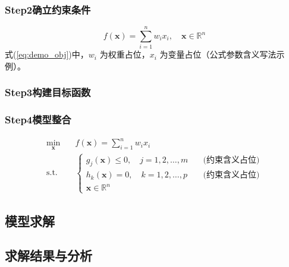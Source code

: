 \documentclass{JXUSTmodeling}
\begin{document}
\subsubsection*{Step2确立约束条件}

\begin{equation}
	f(\boldsymbol{x})=\sum_{i=1}^{n} w_i x_i,\quad \boldsymbol{x}\in\mathbb{R}^{n}
	\label{eq:demo_obj}
\end{equation}
式(\ref{eq:demo_obj})中，$w_i$ 为权重占位，$x_i$ 为变量占位（公式参数含义写法示例）。

\subsubsection*{Step3构建目标函数}

\subsubsection*{Step4模型整合}
\begin{equation*}
	\begin{aligned}
		\min_{\boldsymbol{x}} \quad & f(\boldsymbol{x})=\sum_{i=1}^{n} w_i x_i \\
		\text{s.t.} \quad
		& \begin{cases}
			g_j(\boldsymbol{x}) \le 0, \quad j=1,2,\dots,m \quad &\text{(约束含义占位)}\\
			h_k(\boldsymbol{x}) = 0, \quad k=1,2,\dots,p \quad &\text{(约束含义占位)}\\
			\boldsymbol{x}\in\mathbb{R}^{n}
		\end{cases}
	\end{aligned}
\end{equation*}

\subsection{模型求解}

\subsection{求解结果与分析}
\end{document}
